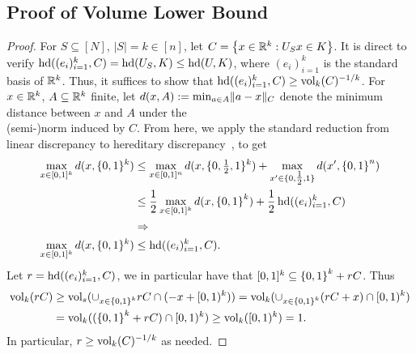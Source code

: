 \subsection{Proof of Volume Lower Bound}
\label{sec:proof-vollb}

\vollbstat*
\begin{proof}
For $S \subseteq [N]$, $|S| = k \in [n]$, let $C = \left\{ x \in {\mathbb{R}}^k: U_S x \in
K \right\}$. It is direct to verify $\operatorname{hd}((e_i)_{i=1}^k,C) = \operatorname{hd}(U_S,K) \leq \operatorname{hd}(U,K)$,
where $(e_i)_{i=1}^k$ is the standard basis of ${\mathbb{R}}^k$. Thus, it suffices to
show that $\operatorname{hd}((e_i)_{i=1}^k,C) \geq \operatorname{vol}_k(C)^{-1/k}$. For $x \in {\mathbb{R}}^k$, $A
\subseteq {\mathbb{R}}^k$ finite, let $d(x,A) := \min_{a \in A} \lVert a-x\rVert_C$
denote the minimum distance between $x$ and $A$ under the \\ (semi-)norm induced by
$C$. From here, we apply the standard reduction from linear discrepancy to
hereditary discrepancy~\cite{LSV}, to get
\begin{align*}
\max_{x \in [0,1]^k} d(x,\{0,1\}^k) &\leq \max_{x \in [0,1]^n}
d(x,\{0,\tfrac12,1\}^k) + \max_{x' \in \{0,\tfrac12,1\}} d(x',\left\{ 0,1 \right\}^n) \\
&\leq \frac{1}{2} \max_{x \in [0,1]^k} d(x,\left\{ 0,1 \right\}^k) + \frac{1}{2}
\operatorname{hd}((e_i)_{i=1}^k,C) \\
&\Rightarrow \\
\max_{x \in [0,1]^k} d(x,\{0,1\}^k) &\leq \operatorname{hd}((e_i)_{i=1}^k,C).
\end{align*}
Let $r = \operatorname{hd}((e_i)_{i=1}^k,C)$, we in particular have that $[0,1]^k \subseteq
\left\{ 0,1 \right\}^k + rC$. Thus
\begin{align*}
\operatorname{vol}_k(rC) &\geq \operatorname{vol}_s(\cup_{x \in \left\{ 0,1 \right\}^k} rC \cap (-x+[0,1)^k)) 
             = \operatorname{vol}_k(\cup_{x \in \left\{ 0,1 \right\}^k} (rC+x) \cap [0,1)^k) \\
             &= \operatorname{vol}_k((\left\{ 0,1 \right\}^k+rC) \cap [0,1)^k) 
              \geq \operatorname{vol}_k([0,1)^k) = 1 .
\end{align*}
In particular, $r \geq \operatorname{vol}_k(C)^{-1/k}$ as needed.
\end{proof}
